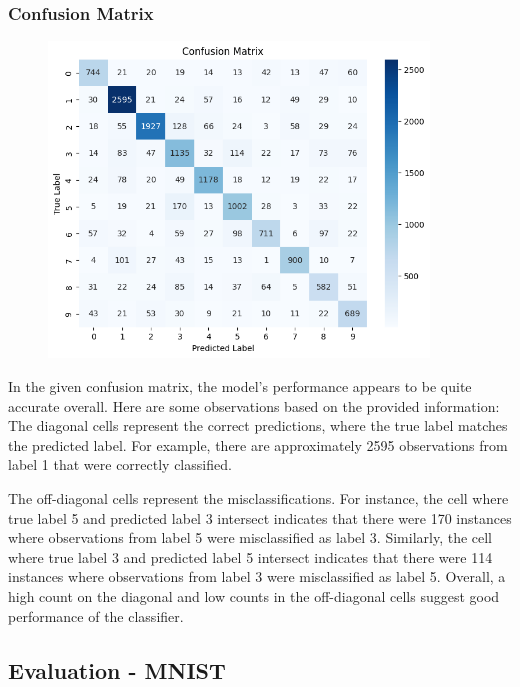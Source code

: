 \documentclass{midl} %
\begin{document}
\subsubsection{Confusion Matrix}
\begin{figure} [H]
 \centering
  \includegraphics[width=0.9\textwidth]{confusion_matrix_svhn.png}\hfill
\end{figure}
In the given confusion matrix, the model's performance appears to be quite accurate overall. Here are some observations based on the provided information:
The diagonal cells represent the correct predictions, where the true label matches the predicted label. For example, there are approximately 2595 observations from label 1 that were correctly classified.

The off-diagonal cells represent the misclassifications. For instance, the cell where true label 5 and predicted label 3 intersect indicates that there were 170 instances where observations from label 5 were misclassified as label 3.
Similarly, the cell where true label 3 and predicted label 5 intersect indicates that there were 114 instances where observations from label 3 were misclassified as label 5.
Overall, a high count on the diagonal and low counts in the off-diagonal cells suggest good performance of the classifier. 






\subsection{Evaluation - MNIST}
\end{document}
